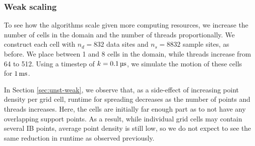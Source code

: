 \subsubsection{Weak scaling}

To see how the algorithms scale given more computing resources, we increase the
number of cells in the domain and the number of threads proportionally. We
construct each cell with $n_d=832$ data sites and $n_s=8832$ sample sites, as
before. We place between 1 and 8 cells in the domain, while threads increase
from 64 to 512. Using a timestep of $k = 0.1\us$, we simulate the motion of
these cells for $1\ms$.

In Section \ref{sec:unst-weak}, we observe that, as a side-effect of increasing
point density per grid cell, runtime for spreading decreases as the number of
points and threads increases. Here, the cells are initially far enough part as
to not have any overlapping support points.  As a result, while individual grid
cells may contain several IB points, average point density is still low, so we
do not expect to see the same reduction in runtime as observed previously.

